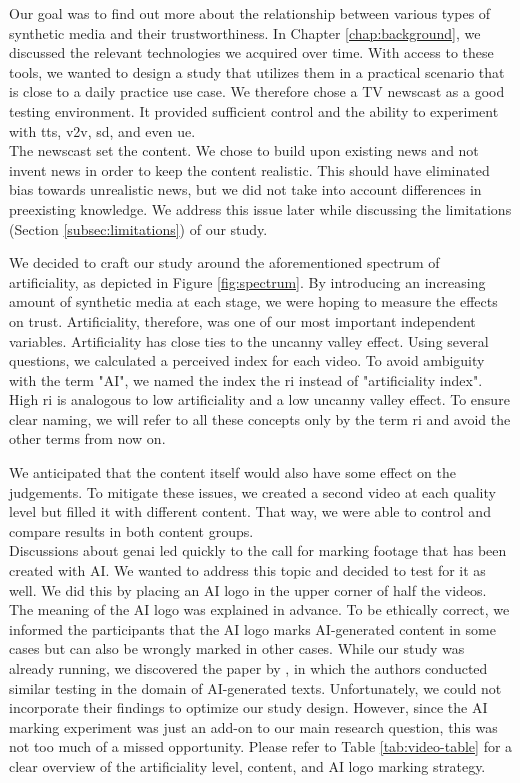 \documentclass[
  a4paper,  %
  twoside,  %
  bibliography=totoc,
  headsepline,
  cleardoublepage=empty,
  parskip=half,
  draft=false
]{scrbook}
\begin{document}
Our goal was to find out more about the relationship between various types of synthetic media and their trustworthiness. In Chapter \ref{chap:background}, we discussed the relevant technologies we acquired over time. With access to these tools, we wanted to design a study that utilizes them in a practical scenario that is close to a daily practice use case. We therefore chose a TV newscast as a good testing environment. It provided sufficient control and the ability to experiment with \gls{tts}, \gls{v2v}, \gls{sd}, and even \gls{ue}. \\
The newscast set the content. We chose to build upon existing news and not invent news in order to keep the content realistic. This should have eliminated bias towards unrealistic news, but we did not take into account differences in preexisting knowledge. We address this issue later while discussing the limitations (Section \ref{subsec:limitations}) of our study.

We decided to craft our study around the aforementioned spectrum of artificiality, as depicted in Figure \ref{fig:spectrum}. By introducing an increasing amount of synthetic media at each stage, we were hoping to measure the effects on trust. Artificiality, therefore, was one of our most important independent variables. Artificiality has close ties to the uncanny valley effect. Using several questions, we calculated a perceived index for each video. To avoid ambiguity with the term "AI", we named the index the \gls{ri} instead of "artificiality index". High \gls{ri} is analogous to low artificiality and a low uncanny valley effect. To ensure clear naming, we will refer to all these concepts only by the term \gls{ri} and avoid the other terms from now on.

We anticipated that the content itself would also have some effect on the judgements. To mitigate these issues, we created a second video at each quality level but filled it with different content. That way, we were able to control and compare results in both content groups. \\
Discussions about \gls{genai} led quickly to the call for marking footage that has been created with AI. We wanted to address this topic and decided to test for it as well. We did this by placing an AI logo in the upper corner of half the videos. The meaning of the AI logo was explained in advance. To be ethically correct, we informed the participants that the AI logo marks AI-generated content in some cases but can also be wrongly marked in other cases. While our study was already running, we discovered the paper by \citeauthor{toffTheyCouldJust2023}, in which the authors conducted similar testing in the domain of AI-generated texts. Unfortunately, we could not incorporate their findings to optimize our study design. However, since the AI marking experiment was just an add-on to our main research question, this was not too much of a missed opportunity. Please refer to Table \ref{tab:video-table} for a clear overview of the artificiality level, content, and AI logo marking strategy.
\end{document}
